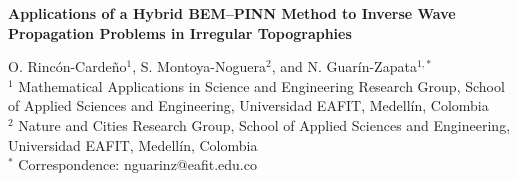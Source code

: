 \documentclass[11pt,twoside]{article}
\begin{document}
\thispagestyle{empty}  



\vspace{-2mm} 
\begin{minipage}{15.0cm}
    \begin{center}
        \textbf{\large Applications of a Hybrid BEM–PINN Method to Inverse Wave Propagation Problems in Irregular Topographies}  
    \end{center}                 
\end{minipage} 
\begin{minipage}{0.0cm}
    \begin{center}
    \end{center}
\end{minipage}    
 
\vspace{-2mm} 

\vspace{0.6cm}
 
{\footnotesize\noindent O. Rincón-Cardeño$^1$, S. Montoya-Noguera$^2$, and N. Guarín-Zapata$^{1,*}$ \\
$^1$ Mathematical Applications in Science and Engineering Research Group, School of Applied Sciences and Engineering, Universidad EAFIT, 
  Medellín, Colombia \\
$^2$ Nature and Cities Research Group, School of Applied Sciences and Engineering, Universidad EAFIT, Medellín, Colombia\\
  $^*$ Correspondence: nguarinz@eafit.edu.co}
 
 

\end{document}
